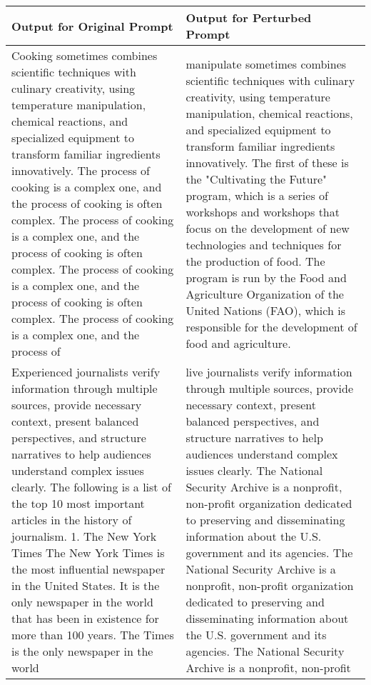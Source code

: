 \documentclass{article}
\begin{document}
\begin{center}
\begin{tabular}{|p{8cm} | p{8cm}|} 
 \hline
 Output for Original Prompt & Output for Perturbed Prompt \\
 \hline
Cooking sometimes combines scientific techniques with culinary creativity, using temperature manipulation, chemical reactions, and specialized equipment to transform familiar ingredients innovatively. The process of cooking is a complex one, and the process of cooking is often complex. The process of cooking is a complex one, and the process of cooking is often complex. The process of cooking is a complex one, and the process of cooking is often complex. The process of cooking is a complex one, and the process of & manipulate sometimes combines scientific techniques with culinary creativity, using temperature manipulation, chemical reactions, and specialized equipment to transform familiar ingredients innovatively. The first of these is the "Cultivating the Future" program, which is a series of workshops and workshops that focus on the development of new technologies and techniques for the production of food. The program is run by the Food and Agriculture Organization of the United Nations (FAO), which is responsible for the development of food and agriculture.\\
\hline
Experienced journalists verify information through multiple sources, provide necessary context, present balanced perspectives, and structure narratives to help audiences understand complex issues clearly. The following is a list of the top 10 most important articles in the history of journalism. 1. The New York Times The New York Times is the most influential newspaper in the United States. It is the only newspaper in the world that has been in existence for more than 100 years. The Times is the only newspaper in the world & live journalists verify information through multiple sources, provide necessary context, present balanced perspectives, and structure narratives to help audiences understand complex issues clearly. The National Security Archive is a nonprofit, non-profit organization dedicated to preserving and disseminating information about the U.S. government and its agencies. The National Security Archive is a nonprofit, non-profit organization dedicated to preserving and disseminating information about the U.S. government and its agencies. The National Security Archive is a nonprofit, non-profit\\
 \hline

\end{tabular}
\end{center}
\end{document}
